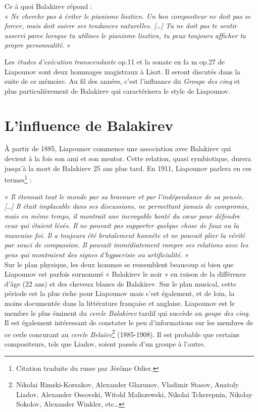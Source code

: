 \vspace*{-0.25cm}

\indent Ce à quoi Balakirev répond :\\
\indent« \emph{Ne cherche pas à éviter le pianisme lisztien. Un bon compositeur ne doit pas se forcer, mais doit suivre ses tendances naturelles. [\dots] Tu ne doit pas te sentir asservi parce lorsque tu utilises le pianisme lisztien, tu peux toujours afficher ta propre personnalité.} »

Les \emph{études d'exécution transcendante} op.11 et la sonate en fa m op.27 de Liapounov sont deux hommages magistraux à Liszt. Il seront discutés dans la suite de ce mémoire. Au fil des années, c'est l'influance du \emph{Groupe des cinq} et plus particulièrement de Balakirev qui caractérisera le style de Liapounov.

\section{L'influence de Balakirev}

À partir de 1885, Liapounov commence une association avec Balakirev qui devient à la fois son ami et son mentor. Cette relation, quasi symbiotique, durera jusqu'à la mort de Balakirev 25 ans plus tard. En 1911, Liapounov parlera en ces termes\footnote{Citation traduite du russe par Jérôme Odier.} :

« \emph{Il étonnait tout le monde par sa bravoure et par l'indépendance de sa pensée. [\dots] Il était implacable dans ses discussions, ne permettant jamais de compromis, mais en même temps, il montrait une incroyable bonté du cœur pour défendre ceux qui étaient lésés. Il ne pouvait pas supporter quelque chose de faux ou la mauvaise foi. Il a toujours été brutalement honnête et ne pouvait plier la vérité par souci de compassion. Il pouvait immédiatement rompre ses relations avec les gens qui montraient des signes d'hypocrisie ou artificialité.} »\\

Sur le plan physique, les deux hommes se ressemblent beaucoup si bien que Liapounov est parfois surnommé « Balakirev le noir » en raison de la différence d'âge (22 ans) et des cheveux blancs de Balakirev. Sur le plan musical, cette période est la plus riche pour Liapounov mais c'est également, et de loin, la moins documentée dans la littérature française et anglaise. Liapounov est le membre le plus éminent du \emph{cercle Balakirev} tardif qui succède au \emph{goupe des cinq}. Il est également intéressant de constater le peu d'informations sur les membres de ce cerle concurant au \emph{cercle Belaïev}\footnote{Nikolai Rimski-Korsakov, Alexander Glazunov, Vladimir Stasov, Anatoly Liadov, Alexander Ossovski, Witold Maliszewski, Nikolai Tcherepnin, Nikolay Sokolov, Alexander Winkler, etc\dots} (1885-1908). Il est probable que certains compositeurs, tels que Liadov, soient passés d'un groupe à l'autre.\\

